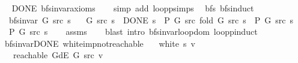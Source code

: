 \begin{isabellebody}
%
\isadelimproof
\ \ %
\endisadelimproof
%
\isatagproof
{}\isamarkupfalse%
\ DONE\ bfs{\isacharunderscore}{\kern0pt}invar{\isacharunderscore}{\kern0pt}axioms\isanewline
\ \ \isamarkupfalse%
\ {\isacharparenleft}{\kern0pt}simp\ add{\isacharcolon}{\kern0pt}\ loop{\isacharunderscore}{\kern0pt}psimps{\isacharparenright}{\kern0pt}%
\endisatagproof
{\isafoldproof}%
%
\isadelimproof
\isanewline
%
\endisadelimproof
\isanewline
{}\isamarkupfalse%
\ {\isacharparenleft}{\kern0pt}\ bfs{\isacharparenright}{\kern0pt}\ bfs{\isacharunderscore}{\kern0pt}induct{\isacharcolon}{\kern0pt}\isanewline
\ \ \ {\isachardoublequoteopen}bfs{\isacharunderscore}{\kern0pt}invar{\isacharprime}{\kern0pt}\ G\ src\ s{\isachardoublequoteclose}\isanewline
\ \ \ {\isachardoublequoteopen}{\isasymAnd}G\ src\ s{\isachardot}{\kern0pt}\ {\isacharparenleft}{\kern0pt}{\isasymnot}\ DONE\ s\ {\isasymLongrightarrow}\ P\ G\ src\ {\isacharparenleft}{\kern0pt}fold\ G\ src\ s{\isacharparenright}{\kern0pt}{\isacharparenright}{\kern0pt}\ {\isasymLongrightarrow}\ P\ G\ src\ s{\isachardoublequoteclose}\isanewline
\ \ \ {\isachardoublequoteopen}P\ G\ src\ s{\isachardoublequoteclose}\isanewline
%
\isadelimproof
\ \ %
\endisadelimproof
%
\isatagproof
{}\isamarkupfalse%
\ assms\isanewline
\ \ \isamarkupfalse%
\ {\isacharparenleft}{\kern0pt}blast\ intro{\isacharcolon}{\kern0pt}\ bfs{\isacharunderscore}{\kern0pt}invar{\isachardot}{\kern0pt}loop{\isacharunderscore}{\kern0pt}dom\ loop{\isachardot}{\kern0pt}pinduct{\isacharparenright}{\kern0pt}%
\endisatagproof
{\isafoldproof}%
%
\isadelimproof
%
\endisadelimproof
%
\isadelimdocument
%
\endisadelimdocument
%
\isatagdocument
%
\isamarkuptrue%
%
\endisatagdocument
{\isafolddocument}%
%
\isadelimdocument
%
\endisadelimdocument
{}\isamarkupfalse%
\ {\isacharparenleft}{\kern0pt}\ bfs{\isacharunderscore}{\kern0pt}invar{\isacharunderscore}{\kern0pt}DONE{\isacharparenright}{\kern0pt}\ white{\isacharunderscore}{\kern0pt}imp{\isacharunderscore}{\kern0pt}not{\isacharunderscore}{\kern0pt}reachable{\isacharcolon}{\kern0pt}\isanewline
\ \ \ {\isachardoublequoteopen}white\ s\ v{\isachardoublequoteclose}\isanewline
\ \ \ {\isachardoublequoteopen}{\isasymnot}\ reachable\ {\isacharparenleft}{\kern0pt}G{\isachardot}{\kern0pt}dE\ G{\isacharparenright}{\kern0pt}\ src\ v{\isachardoublequoteclose}\isanewline
%
\isadelimproof
%
\endisadelimproof

\end{isabellebody}
